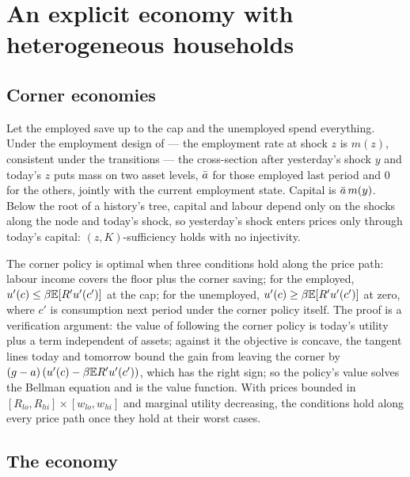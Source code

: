 \section{An explicit economy with heterogeneous households}\label{sec:corner}

\subsection{Corner economies}

Let the employed save up to the cap and the unemployed spend everything. Under the employment
design of \citet{krusellsmith1998} --- the employment rate at shock $z$ is $m(z)$, consistent under
the transitions --- the cross-section after yesterday's shock $y$ and today's $z$ puts mass on two
asset levels, $\bar a$ for those employed last period and $0$ for the others, jointly with the current
employment state. Capital is $\bar a\, m(y)$. Below the root of a history's tree, capital and labour
depend only on the shocks along the node and today's shock, so yesterday's shock enters prices only
through today's capital: $(z,K)$-sufficiency holds with no injectivity.

The corner policy is optimal when three conditions hold along the price path: labour income covers
the floor plus the corner saving; for the employed, $u'(c)\le\beta\mathbb{E}[R'u'(c')]$ at the cap; for the
unemployed, $u'(c)\ge\beta\mathbb{E}[R'u'(c')]$ at zero, where $c'$ is consumption next period under the
corner policy itself. The proof is a verification argument: the value of following the corner policy
is today's utility plus a term independent of assets; against it the objective is concave, the
tangent lines today and tomorrow bound the gain from leaving the corner by
$(g-a)\,(u'(c)-\beta\mathbb{E} R'u'(c'))$, which has the right sign; so the policy's value solves the Bellman
equation and is the value function. With prices bounded in $[R_{lo},R_{hi}]\times[w_{lo},w_{hi}]$ and
marginal utility decreasing, the conditions hold along every price path once they hold at their
worst cases.

\subsection{The economy}

